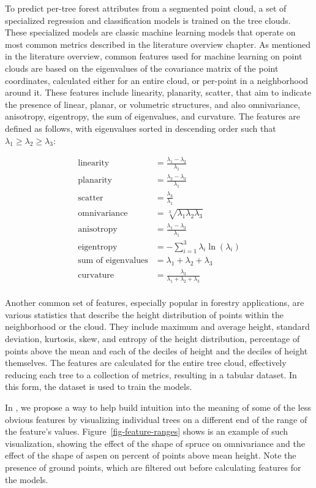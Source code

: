 To predict per-tree forest attributes from a segmented point cloud, a set of specialized regression and classification models is trained on the tree clouds.
These specialized models are classic machine learning models that operate on most common metrics described in the literature overview chapter.
As mentioned in the literature overview, common features used for machine learning on point clouds are based on the eigenvalues of the covariance matrix of the point coordinates, calculated either for an entire cloud, or per-point in a neighborhood around it.
These features include linearity, planarity, scatter, that aim to indicate the presence of linear, planar, or volumetric structures, and also omnivariance, anisotropy, eigentropy, the sum of eigenvalues, and curvature.
The features are defined as follows, with eigenvalues sorted in descending order such that $\lambda_1 \ge \lambda_2 \ge \lambda_3$:

$$
\begin{aligned}
\text{linearity} &= \frac{\lambda_1 - \lambda_2}{\lambda_1} \\
\text{planarity} &= \frac{\lambda_2 - \lambda_3}{\lambda_1} \\
\text{scatter} &= \frac{\lambda_3}{\lambda_1}  \\
\text{omnivariance} &= \sqrt[3]{\lambda_1\lambda_2\lambda_3} \\
\text{anisotropy} &= \frac{\lambda_1 - \lambda_3}{\lambda_1} \\
\text{eigentropy} &= -\sum_{i=1}^{3} \lambda_i \ln(\lambda_i) \\
\text{sum of eigenvalues} &= \lambda_1 + \lambda_2 + \lambda_3 \\
\text{curvature} &= \frac{\lambda_3}{\lambda_1 + \lambda_2 + \lambda_3} \\
\end{aligned}
$$

Another common set of features, especially popular in forestry applications, are various statistics that describe the height distribution of points within the neighborhood or the cloud.
They include maximum and average height, standard deviation, kurtosis, skew, and entropy of the height distribution, percentage of points above the mean and each of the deciles of height and the deciles of height themselves.
The features are calculated for the entire tree cloud, effectively reducing each tree to a collection of metrics, resulting in a tabular dataset.
In this form, the dataset is used to train the models.

In \citet{dubrovinExplorationPropertiesPoint2024}, we propose a way to help build intuition into the meaning of some of the less obvious features by visualizing individual trees on a different end of the range of the feature's values.
Figure~\ref{fig-feature-ranges} shows is an example of such visualization, showing the effect of the shape of spruce on omnivariance and the effect of the shape of aspen on percent of points above mean height.
Note the presence of ground points, which are filtered out before calculating features for the models.

